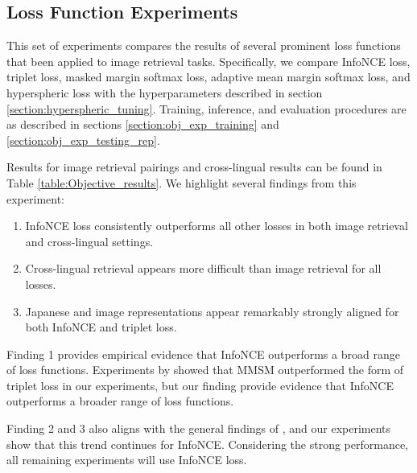 \subsection{Loss Function Experiments}
\label{section:direct_compare}

This set of experiments compares the results of several prominent loss functions that been applied to image retrieval tasks.
Specifically, we compare InfoNCE loss, triplet loss, masked margin softmax loss, adaptive mean margin softmax loss, and hyperspheric loss with the hyperparameters described in section \ref{section:hyperspheric_tuning}.
Training, inference, and evaluation procedures are as described in sections \ref{section:obj_exp_training} and \ref{section:obj_exp_testing_rep}.



Results for image retrieval pairings and cross-lingual results can be found in Table \ref{table:Objective_results}.
We highlight several findings from this experiment:
\begin{enumerate}
    \item InfoNCE loss consistently outperforms all other losses in both image retrieval and cross-lingual settings.
    \item Cross-lingual retrieval appears more difficult than image retrieval for all losses.
    \item Japanese and image representations appear remarkably strongly aligned for both InfoNCE and triplet loss.
\end{enumerate}

Finding 1
provides empirical evidence that InfoNCE outperforms a broad range of loss functions.
Experiments by \cite{ohishi2020trilingual} showed that MMSM outperformed the form of triplet loss in our experiments, but our finding provide evidence that InfoNCE outperforms a broader range of loss functions.


Finding 2 and 3 also aligns with the general findings of \cite{ohishi2020trilingual}, and our experiments show that this trend continues for InfoNCE.
Considering the strong performance, all remaining experiments will use InfoNCE loss.

